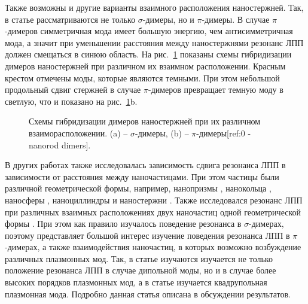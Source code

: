 Также возможны и другие варианты взаимного расположения наностержней. Так, в статье \cite{nanorods1} рассматриваются не только $ \sigma$-димеры, но и $ \pi$-димеры. В случае $ \pi$-димеров симметричная мода имеет большую энергию, чем антисимметричная мода, а значит при уменьшении расстояния между наностержнями резонанс ЛПП должен смещаться в синюю область. На рис.~\ref{img:dimer_resonances} показаны схемы гибридизации димеров наностержней при различном их взаимном расположении. Красным крестом отмечены моды, которые являются темными. При этом небольшой продольный сдвиг стержней в случае $ \pi$-димеров превращает темную моду в светлую, что и показано на рис.~\ref{img:dimer_resonances}b. 

\begin{figure}[t]
\caption{Схемы гибридизации димеров наностержней при их различном взаиморасположении. (a) -- $ \sigma$-димеры, (b) -- $ \pi $-димеры[ref:0 - nanorod dimers].}
\label{img:dimer_resonances}
\end{figure}

В других работах также исследовалась зависимость сдвига резонанса ЛПП в зависимости от расстояния между наночастицами. При этом частицы были различной геометрической формы, например, нанопризмы \cite{nanoprism, nanoshells}, нанокольца \cite{nanoring}, наносферы \cite{nanospheres, nanospheres2}, наноциллиндры \cite{nanocyllinders} и наностержни \cite{nanorods}. Также исследовался резонанс ЛПП при различных взаимных расположениях двух наночастиц одной геометрической формы \cite{nanorods2, nanorods3, 3druler}. При этом как правило изучалось поведение резонанса в $ \sigma$-димерах, поэтому представляет большой интерес изучение поведения резонанса ЛПП в $ \pi$-димерах, а также взаимодействия наночастиц, в которых возможно возбуждение различных плазмонных мод. Так, в статье изучаются \cite{nanoring} изучается не только положение резонанса ЛПП в случае дипольной моды, но и в случае более высоких порядков плазмонных мод, а в статье \cite{diffractionCoupling} изучается квадрупольная плазмонная мода. Подробно данная статья описана в обсуждении результатов.
